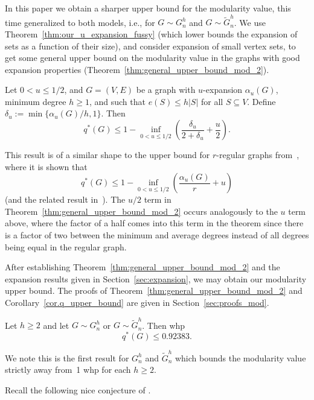 \documentclass[runningheads, envcountsame, smallextended]{llncs}
\newcommand{\q}{q^*}
\numberwithin{theorem}{section}
\numberwithin{definition}{section}
\numberwithin{lemma}{section}
\numberwithin{corollary}{section}
\numberwithin{proposition}{section}
\numberwithin{conjecture}{section}
\numberwithin{remark}{section}
\numberwithin{equation}{section}
\begin{document}
In this paper we obtain a sharper upper bound for the modularity value, this time generalized to both models, i.e., for $G\sim G^h_n$ and $G\sim \tilde{G}^h_n$. 
We use Theorem~\ref{thm:our_u_expansion_fussy} (which lower bounds the expansion of sets as a function of their size), and consider expansion of small vertex sets, 
to get some general upper bound on the modularity value in the graphs with good expansion properties (Theorem~\ref{thm:general_upper_bound_mod_2}). 

\begin{theorem}\label{thm:general_upper_bound_mod_2}
Let $0<u\leq 1/2$, and $G=(V,E)$ be a graph with $u$-expansion $\alpha_u(G)$, minimum degree $h \geq 1$, and such that $e(S) \leq h |S|$ for all $S \subseteq V$. 
Define   
$\delta_u:= \min\{\alpha_u(G)/h,1\}$. Then
	\[
	q^*(G) \leq 1- \inf_{0 < u \leq 1/2} \left(\frac{\delta_u}{2+\delta_u} + \frac{u}{2}\right).
	\]
\end{theorem}
%
This result is of a similar shape to the upper bound for $r$-regular graphs from~\cite{treelike}, where it is shown that
    \[
	q^*(G) \leq 1- \inf_{0 < u \leq 1/2} \left( \frac{\alpha_u(G)}{r} + u \right)
	\]
(and the related result in~\cite{prokhorenkova2017modularity}). The $u/2$ term in Theorem~\ref{thm:general_upper_bound_mod_2} occurs analogously to the $u$ term above, where the factor of a half comes into this term in the theorem since there is a factor of two between the minimum and average degrees instead of all degrees being equal in the regular graph.
%

After establishing Theorem~\ref{thm:general_upper_bound_mod_2} and the expansion results given in Section~\ref{sec:expansion}, we may obtain our modularity upper bound. The proofs of Theorem~\ref{thm:general_upper_bound_mod_2} and Corollary~\ref{cor.q_upper_bound} are given in Section~\ref{sec:proofs_mod}. 
%
\begin{corollary}\label{cor.q_upper_bound}
	Let $h\geq 2$ and let $G \sim G^h_n$ or $G \sim \tilde{G}^h_n$. Then whp
	\[ \q(G) \leq 0.92383.
	\] 
\end{corollary} 
%
We note this is the first result for $G_n^h$ and $\tilde{G}^h_n$ which bounds the modularity value strictly away from~1 whp for each $h\geq 2$.
%



Recall the following nice conjecture of \cite{prokhorenkova2017modularity_internet_Math}. 
\end{document}
